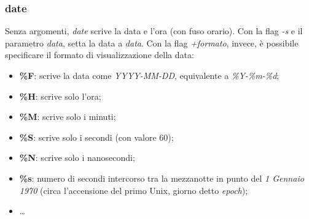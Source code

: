 \subsubsection{date}
Senza argomenti, \textit{date} scrive la data e l'ora (con fuso orario). Con la flag \textit{-s} e il parametro \textit{data}, setta la data a \textit{data}. Con la flag \textit{+formato}, invece, è possibile specificare il formato di visualizzazione della data:
\begin{itemize}
	\item \textbf{\%F}: scrive la data come \textit{YYYY-MM-DD}, equivalente a \textit{\%Y-\%m-\%d};
	\item \textbf{\%H}: scrive solo l'ora;
	\item \textbf{\%M}: scrive solo i minuti;
	\item \textbf{\%S}: scrive solo i secondi (con valore 60);
	\item \textbf{\%N}: scrive solo i nanosecondi;
	\item \textbf{\%s}: numero di secondi intercorso tra la mezzanotte in punto del \textit{1 Gennaio 1970} (circa l'accensione del primo Unix, giorno detto \textit{epoch});
	\item \ldots
\end{itemize}

